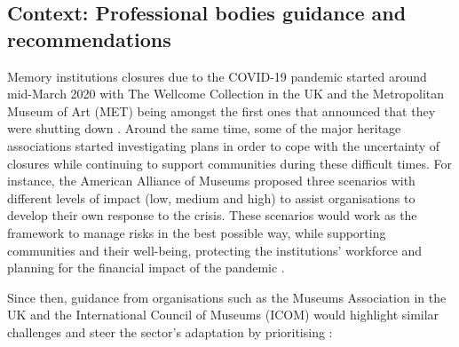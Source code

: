 \documentclass{egpubl}
\begin{document}
\subsection{Context: Professional bodies guidance and recommendations}
\label{con}
Memory institutions closures due to the COVID-19 pandemic started around mid-March 2020 with The Wellcome Collection in the UK and the Metropolitan Museum of Art (MET) being amongst the first ones that announced that they were shutting down \cite{McGivern2020,KendallAdams2020}. Around the same time, some of the major heritage  associations started investigating plans in order to cope with the uncertainty of closures while continuing to support communities during these difficult times. For instance, the American Alliance of Museums proposed three scenarios with different levels of impact (low, medium and high) to assist organisations to develop their own response to the crisis. These scenarios would work as the framework to manage risks in the best possible way, while supporting communities and their well-being, protecting the institutions' workforce and planning for the financial impact of the pandemic \cite{Merritt2020}.

Since then, guidance from organisations such as the Museums Association in the UK and the International Council of Museums (ICOM) would highlight similar challenges and steer the sector's adaptation by prioritising \cite{InternationalCouncilofMuseums2020a,Olorunshola2020,MuseumsAssociation2020}:
 
\end{document}
